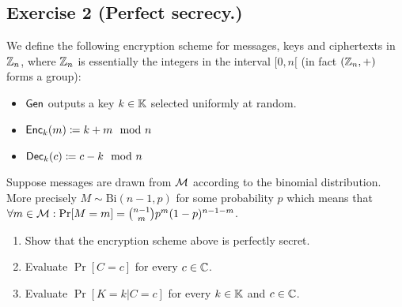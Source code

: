 \subsection{Exercise 2 (Perfect secrecy.)}

We define the following encryption scheme for messages, keys and
ciphertexts in $\mathbb{Z}_n$, where $\mathbb{Z}_n$ is essentially
the integers in the interval $[0,n[$ 
(in fact $(\mathbb{Z}_n,+)$ forms a group):
\begin{itemize}
  \item $\operatorname{\mathsf{Gen}}$ outputs a key $k \in \mathbb{K}$ selected uniformly at random.
  \item $\operatorname{\mathsf{Enc}}_k(m) \coloneqq k+m \mod n$
  \item $\operatorname{\mathsf{Dec}}_k(c) \coloneqq c-k \mod n$
\end{itemize}

Suppose messages are drawn from $\mathcal{M}$ according to the binomial
distribution. More precisely $M\sim \mathrm{Bi}(n-1,p)$ for some probability $p$ 
which means that $\forall m\in \mathcal{M}: \Pr[M=m]=\binom{n-1}{m}p^{m}(1-p)^{n-1-m}$.

\begin{enumerate}
  \item Show that the encryption scheme above is perfectly secret.
  \item Evaluate $\Pr[C=c]$ for every $c \in \mathbb{C}$.
  \item Evaluate $\Pr[K=k|C=c]$ for every $k\in \mathbb{K}$ and $c\in \mathbb{C}$.
\end{enumerate}


